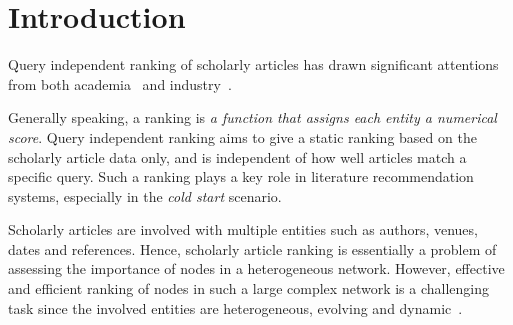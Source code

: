 \section{Introduction}
\label{sec-intro}

Query independent ranking of scholarly articles has drawn significant attentions from both academia~\cite{Garfield471,ChenXMR07,Zhou07-CoRank,ShenAAAI16,Liang16AAAI,Jiang12-MRank,Waltman2014,TanLMGSW16} and industry~\cite{sem-scholar,g-scholar,Sinha15:MAG}.



Generally speaking, a ranking is {\em a function that assigns each entity a numerical score}. Query independent ranking aims to give a static ranking based on the scholarly article data only, and is independent of how well articles match a specific query. Such a ranking plays a key role in literature recommendation systems, especially in the {\em cold start} scenario.

Scholarly articles are involved with multiple entities such as authors, venues, dates and references. Hence, scholarly article ranking is essentially a problem of assessing the importance of nodes in a heterogeneous network.
However, effective and efficient ranking of nodes in such a large complex network is a challenging task since the involved entities
are heterogeneous, evolving and dynamic~\cite{AggarwalS14-survey,fcs-biggraph}.



